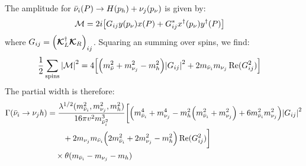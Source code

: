 The amplitude for \(\bar{\nu}_{i}(P) \to H(p_{h}) + \nu_j(p_{\nu})\) is given by:
\begin{align}
	\mathcal{M} & = 2i \qty[G_{ij}y(p_{\nu})x(P) + G^{*}_{ij}x^{\dagger}(p_{\nu})y^{\dagger}(P)]
\end{align}
where \(G_{ij} = \qty(\bm{\mathcal{K}}_{L}^{\dagger}\bm{\mathcal{K}}_{R})_{ij}\). Squaring an summing
over spins, we find:
\begin{align}
	\frac{1}{2}\sum_{\mathrm{spins}}\qty|\mathcal{M}|^2
	 & =
	4\qty[\qty(m_{\bar{\nu}}^2+m_{\nu_{j}}^2 - m_{h}^2) \qty|G_{ij}|^2 + 2m_{\bar{\nu}_{i}}m_{\nu_{j}}\Re(G_{ij}^2)]
\end{align}
The partial width is therefore:
\begin{align}
	\Gamma(\bar{\nu}_{i}\to \nu_{j}h)
	 & =
	\frac{\lambda^{1/2}(m^{2}_{\bar{\nu}_{i}},m_{\nu_{j}}^2,m_{h}^{2})}{16\pi v^{2}m^{3}_{\bar{\nu}^{2}_{i}}}
	\bigg{[}
	\qty(m_{\bar{\nu}_{i}}^4+m_{\nu_{j}}^4 - m_{h}^2\qty(m_{\bar{\nu}_{i}}^2+m_{\nu_{j}}^2) + 6m_{\bar{\nu}_{i}}^2m_{\nu_{j}}^2) \qty|G_{ij}|^2 \\
	 & \quad\quad + 2m_{\nu_{j}}m_{\bar{\nu}_{i}}\qty(2m_{\bar{\nu}_{i}}^2 + 2m_{\nu_{j}}^2 - m_{h}^2)\Re(G_{ij}^2)
	\bigg{]}\notag                                                                                                               \\
	 & \quad\times \theta(m_{\bar{\nu}_{i}}-m_{\nu_{j}}-m_{h})\notag
\end{align}
